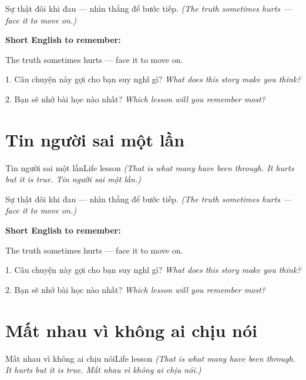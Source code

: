 \begin{baihoc}
Sự thật đôi khi đau — nhìn thẳng để bước tiếp.
\textit{(The truth sometimes hurts — face it to move on.)}
\end{baihoc}

\begin{ghinhoanh}
\textbf{Short English to remember:}

The truth sometimes hurts — face it to move on.

\end{ghinhoanh}

\begin{tuhocnhanh}
1. Câu chuyện này gợi cho bạn suy nghĩ gì? \textit{What does this story make you think?}

2. Bạn sẽ nhớ bài học nào nhất? \textit{Which lesson will you remember most?}
\end{tuhocnhanh}
\ngancach


\section{Tin người sai một lần}
\begin{truyen}{Tin người sai một lần}{Life lesson}
\textit{(That is what many have been through. It hurts but it is true. Tin người sai một lần.)}
\end{truyen}

\begin{baihoc}
Sự thật đôi khi đau — nhìn thẳng để bước tiếp.
\textit{(The truth sometimes hurts — face it to move on.)}
\end{baihoc}

\begin{ghinhoanh}
\textbf{Short English to remember:}

The truth sometimes hurts — face it to move on.

\end{ghinhoanh}

\begin{tuhocnhanh}
1. Câu chuyện này gợi cho bạn suy nghĩ gì? \textit{What does this story make you think?}

2. Bạn sẽ nhớ bài học nào nhất? \textit{Which lesson will you remember most?}
\end{tuhocnhanh}
\ngancach


\section{Mất nhau vì không ai chịu nói}
\begin{truyen}{Mất nhau vì không ai chịu nói}{Life lesson}
\textit{(That is what many have been through. It hurts but it is true. Mất nhau vì không ai chịu nói.)}
\end{truyen}

